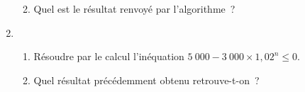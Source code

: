 \begin{enumerate}
\begin{enumerate}[label=\alph*.]
\begin{center}
\begin{extern}
\begin{tabularx}{0.25\linewidth}{|X|}
                    \end{tabularx}
                    \end{extern}
               \end{center}
          \item Quel est le résultat renvoyé par l'algorithme~?
     \end{enumerate}
     \item
     \begin{enumerate}[label=\alph*.]
          \item Résoudre par le calcul l'inéquation $5~000 - 3~000 \times 1,02^n \leqslant 0$.
          \item Quel résultat précédemment obtenu retrouve-t-on~?
     \end{enumerate}
\end{enumerate}
